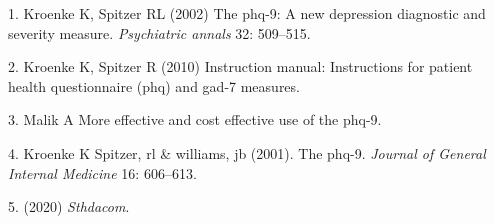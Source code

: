 \documentclass[12pt,]{article}
\begin{document}
\hypertarget{refs}{}
\leavevmode\hypertarget{ref-kroenke2002phq}{}%
1. Kroenke K, Spitzer RL (2002) The phq-9: A new depression diagnostic
and severity measure. \emph{Psychiatric annals} 32: 509--515.

\leavevmode\hypertarget{ref-kroenke2010instruction}{}%
2. Kroenke K, Spitzer R (2010) Instruction manual: Instructions for
patient health questionnaire (phq) and gad-7 measures.

\leavevmode\hypertarget{ref-MalikMoreEf}{}%
3. Malik A More effective and cost effective use of the phq-9.

\leavevmode\hypertarget{ref-kroenke16spitzer}{}%
4. Kroenke K Spitzer, rl \& williams, jb (2001). The phq-9.
\emph{Journal of General Internal Medicine} 16: 606--613.

\leavevmode\hypertarget{ref-STHDA_2020}{}%
5. (2020) \emph{Sthdacom}.
\end{document}
